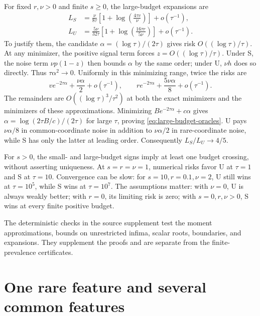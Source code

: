 \documentclass{alt2027}
\begin{document}
For fixed $r,\nu > 0$ and finite $s \geq 0$, the large-budget expansions are
\begin{equation}
  \begin{aligned}
    L_S & = \frac{\nu}{8\tau} \left[ 1 + \log\!\left( \frac{4\tau v}{\nu} \right) \right] + o(\tau^{-1}),     \\
    L_U & = \frac{5\nu}{32\tau} \left[ 1 + \log\!\left( \frac{16\tau r}{5\nu} \right) \right] + o(\tau^{-1}).
  \end{aligned} \label{eq:large-budget-oracles}
\end{equation}
To justify them, the candidate $\alpha = (\log\tau)/(2\tau)$ gives risk
$O((\log\tau)/\tau)$. At any minimizer, the positive signal term forces
$z = O((\log\tau)/\tau)$. Under S, the noise term $\nu p(1 - z)$ then bounds
$\alpha$ by the same order; under U, $\nu h$ does so directly. Thus
$\tau\alpha^2 \to 0$. Uniformly in this minimizing range, twice the risks are
\[
  ve^{-2\tau\alpha}
  + \frac{\nu\alpha}{2}
  + o(\tau^{-1}),\qquad re^{-2\tau\alpha}
  + \frac{5\nu\alpha}{8}
  + o(\tau^{-1}).
\]
The remainders are $O((\log\tau)^3/\tau^2)$ at both the exact minimizers and the
minimizers of these approximations. Minimizing $Be^{-2\tau\alpha} + c\alpha$
gives $\alpha = \log(2\tau B/c)/(2\tau)$ for large $\tau$, proving
\cref{eq:large-budget-oracles}. U pays $\nu\alpha/8$ in common-coordinate noise
in addition to $\nu\alpha/2$ in rare-coordinate noise, while S has only the
latter at leading order. Consequently $L_S/L_U \to 4/5$.

For $s > 0$, the small- and large-budget signs imply at least one budget
crossing, without asserting uniqueness. At $s = r = \nu = 1$, numerical risks
favor U at $\tau = 1$ and S at $\tau = 10$. Convergence can be slow: for
$s = 10,r = 0.1,\nu = 2$, U still wins at $\tau = 10^5$, while S wins at
$\tau = 10^7$. The assumptions matter: with $\nu = 0$, U is always weakly
better; with $r = 0$, its limiting risk is zero; with $s = 0,r,\nu > 0$, S wins
at every finite positive budget.

The deterministic checks in the source supplement test the moment
approximations, bounds on unrestricted infima, scalar roots, boundaries, and
expansions. They supplement the proofs and are separate from the
finite-prevalence certificates.

\section{One rare feature and several common features}
\label{sec:common-block-details}
\end{document}
